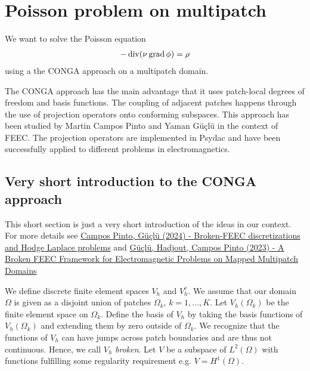 \documentclass[presentation.tex]{subfiles}
\begin{document}
\section{Poisson problem on multipatch}
We want to solve the Poisson equation
\begin{align*}
    -\operatorname{div} (\nu \operatorname{grad} \phi) = \rho
\end{align*}
using a the CONGA approach on a multipatch domain. 

The CONGA approach has the main advantage that it uses patch-local 
degrees of freedom and basis functions. The coupling of adjacent patches 
happens through the use of projection operators onto conforming subspaces. 
This approach has been studied by Martin Campos Pinto and Yaman Güçlü in the context of FEEC. 
The projection operators are implemented in Psydac and 
have been successfully applied to different problems in electromagnetics. 


\subsection*{Very short introduction to the CONGA approach}
This short section is just a very short
introduction of the ideas in our context. 
For more details see \href{https://arxiv.org/abs/2109.02553}{Campos Pinto, Güçlü (2024) - Broken-FEEC discretizations and Hodge Laplace 
problems} and \href{https://link.springer.com/article/10.1007/s10915-023-02351-x}{Güçlü, 
            Hadjout, Campos Pinto (2023) - A Broken FEEC Framework for Electromagnetic Problems on Mapped Multipatch Domains}


We define discrete finite element spaces $V_h$ and $V_h^c$. 
We assume that our domain $\Omega$ is given as a disjoint union of patches 
$\Omega_k$, $k=1, ..., K$.
Let $V_h(\Omega_k)$ be the finite element space on $\Omega_k$. 
Define the basis of $V_h$ by taking the basis functions of $V_h(\Omega_k)$ and 
extending them by zero outside of $\Omega_k$. 
We recognize that the functions of $V_h$ can have jumps across 
patch boundaries and are thus not continuous. 
Hence, we call $V_h$ \textit{broken}.
Let $V$ be a subspace of $L^2(\Omega)$ with functions fulfilling some regularity
requirement e.g. $V=H^1(\Omega)$.
\end{document}
